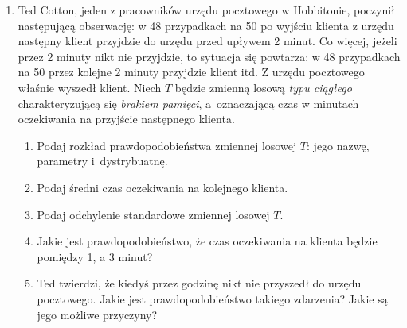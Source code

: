 \documentclass[twoside]{mwart}
\newcommand{\ans}[1]{}
\newcommand{\ans}[1]{\par\emph{Odpowiedź:} #1}
\begin{document}
\begin{enumerate}
\item Ted Cotton, jeden z pracowników urzędu pocztowego w Hobbitonie, poczynił następującą obserwację: w 48 przypadkach na 50 po wyjściu klienta z urzędu następny klient przyjdzie do urzędu przed upływem 2 minut.
Co więcej, jeżeli przez 2 minuty nikt nie przyjdzie, to sytuacja się powtarza: w 48 przypadkach na 50 przez kolejne 2 minuty przyjdzie klient itd.
Z urzędu pocztowego właśnie wyszedł klient.
Niech $T$ będzie zmienną losową \emph{typu ciągłego} charakteryzującą się \emph{brakiem pamięci}, a~oznaczającą czas w minutach oczekiwania na przyjście następnego klienta.

\begin{enumerate}
	\item Podaj rozkład prawdopodobieństwa zmiennej losowej $T$: jego nazwę, parametry i~dystrybuatnę.
	\ans
	{
		Rozkład wykładniczy
		\begin{gather*}
		F(x) = \begin{cases} 1-e^{-\lambda x} & x>0 \\ 0 & \text{wpp} \end{cases} \\
		P(T<2)=F(2)=\frac{48}{50} \\
		1-e^{-2\lambda}=\frac{24}{25} \\
		e^{-2\lambda}=\frac{1}{25} \\ 
		-2\lambda = \ln \frac{1}{25} = -2 \ln 5 \\
		\lambda = \ln 5 \approx 1{,}609
		\end{gather*}
	}
	\item Podaj średni czas oczekiwania na kolejnego klienta.
	\ans{ $ET = \frac{1}{\lambda} = \frac{1}{\ln 5} \approx 0{,}621$ }
	\item Podaj odchylenie standardowe zmiennej losowej $T$.
	\ans{$DT=ET=\frac{1}{\lambda} = \frac{1}{\ln 5} \approx 0{,}621$ }
	\item Jakie jest prawdopodobieństwo, że czas oczekiwania na klienta będzie pomiędzy 1, a 3 minut?
	\ans{$P(1\leq T\leq 3) = F(3)-F(1) = 1-e^{-3\lambda}-(1-e^{-\lambda}) = e^{-\lambda}-e^{-3\lambda}=5^{-1}-5^{-3}=\frac{5^2-1}{5^3}=\frac{24}{125}=0{,}192$}
	\item Ted twierdzi, że kiedyś przez godzinę nikt nie przyszedł do urzędu pocztowego. Jakie jest prawdopodobieństwo takiego zdarzenia? Jakie są jego możliwe przyczyny?
	\ans{$P(T>60)=1-F(60)=1-(1-e^{-60\lambda}) = 5^{-60} \approx 0$}
\end{enumerate}

\end{enumerate}
\end{document}
